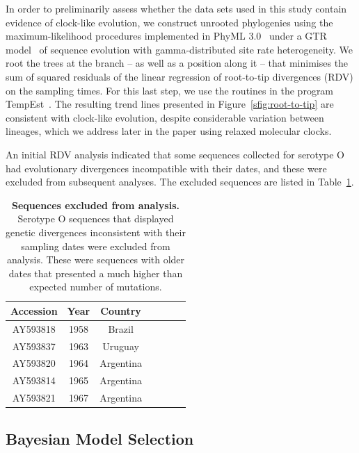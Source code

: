 \documentclass[a4paper,10pt]{article}
\begin{document}
In order to preliminarily assess whether the data sets used in this study contain evidence of clock-like evolution, we construct unrooted phylogenies using the maximum-likelihood procedures implemented in PhyML 3.0~\citep{M-Guindon2003} under a GTR model~\citep{M-Tavare1986} of sequence evolution with gamma-distributed site rate heterogeneity. %
We root the trees at the branch -- as well as a position along it -- that minimises the sum of squared residuals of the linear regression of root-to-tip divergences (RDV) on the sampling times.
For this last step, we use the routines in the program TempEst~\citep{M-Rambaut2016}.
The resulting trend lines presented in Figure~\ref{sfig:root-to-tip} are consistent with clock-like evolution, despite considerable variation between lineages, which we address later in the paper using relaxed molecular clocks.

An initial RDV analysis indicated that some sequences collected for serotype O had evolutionary divergences incompatible with their dates, and these were excluded from subsequent analyses.
The excluded sequences are listed in Table~\ref{stab:exclseqs}.

\begin{table}[H]
\caption{\textbf{Sequences excluded from analysis.}
Serotype O sequences that displayed genetic divergences inconsistent with their sampling dates were excluded from analysis.
These were sequences with older dates that presented a much higher than expected number of mutations.
}
\begin{center}
\begin{tabular}{ccccccc}
\toprule
Accession & Year & Country \\      
\midrule
AY593818 & 1958 & Brazil \\
AY593837 & 1963 & Uruguay \\ 
AY593820 & 1964 & Argentina  \\
AY593814 & 1965 & Argentina \\
AY593821 & 1967 & Argentina \\
\bottomrule
\end{tabular}
\end{center}
\begin{flushleft}
\end{flushleft}
\label{stab:exclseqs}
 \end{table}

 
\subsection*{Bayesian Model Selection}
\end{document}
